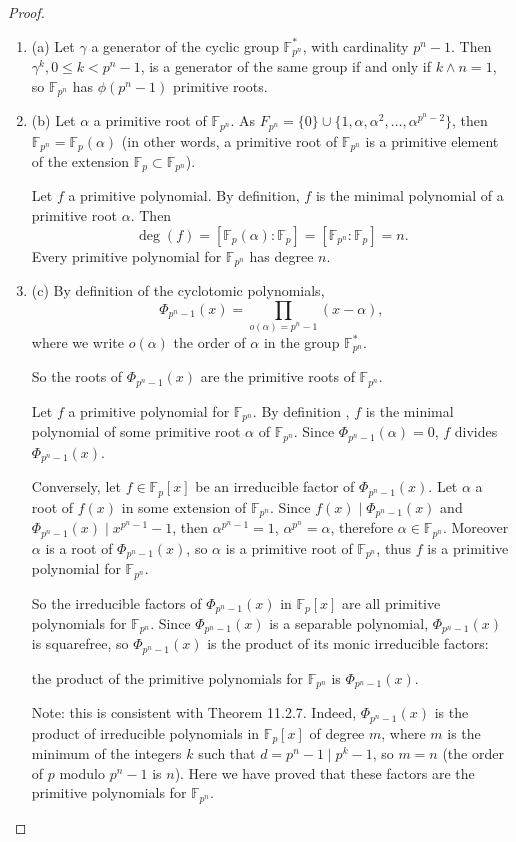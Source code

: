 \documentclass[11pt,a4paper]{article}
\newcommand{\be} {\begin{enumerate}}
\newcommand{\ee} {\end{enumerate}}
\newcommand{\F}{\mathbb{F}}
\begin{document}
\begin{proof}
\be
\item[(a)] Let $\gamma$ a generator of the cyclic group $\F_{p^n}^*$, with cardinality $p^n-1$. Then $\gamma^k, 0 \leq k <p^n-1$, is a generator of the same group if and only if $k \wedge n = 1$, so $\F_{p^n}$ has $\phi(p^n-1)$ primitive roots.

\item[(b)] Let $\alpha$ a primitive root of $\F_{p^n}$. As $F_{p^n} = \{0\} \cup \{1,\alpha,\alpha^2,\ldots,\alpha^{p^n-2}\}$, then $\F_{p^n} = \F_p(\alpha)$ (in other words, a primitive root of $\F_{p^n}$ is a primitive element of the extension $\F_p \subset \F_{p^n}$).

Let $f$ a primitive polynomial. By definition, $f$ is the minimal polynomial of a primitive root $\alpha$. Then
$$\deg(f) = [\F_p(\alpha) : \F_p] = [\F_{p^n}:\F_p] = n.$$
Every primitive polynomial for $\F_{p^n}$ has degree $n$.

\item[(c)] By definition of the cyclotomic polynomials, $$\Phi_{p^n-1}(x) =\prod_{o(\alpha) = p^n-1} (x- \alpha),$$
where we write $o(\alpha )$ the order of $\alpha$ in the group $\F_{p^n}^*$.

So the roots of  $\Phi_{p^n-1}(x) $  are the primitive roots of $\F_{p^n}$.

Let $f$ a primitive polynomial for $\F_{p^n}$. By definition , $f$ is the minimal polynomial of some primitive root $\alpha$ of $\F_{p^n}$. Since $\Phi_{p^n-1}(\alpha) = 0$, $f$ divides $\Phi_{p^n-1}(x)$.

Conversely, let $f \in \F_p[x]$ be an irreducible factor of $\Phi_{p^n-1}(x)$. Let $\alpha$ a root of $f(x)$ in some extension of $\F_{p^n}$. Since $f(x) \mid \Phi_{p^n-1}(x)$ and $\Phi_{p^n-1}(x) \mid x^{p^n-1}-1$, then $\alpha^{p^n-1} = 1$, $\alpha^{p^n} = \alpha$, therefore $\alpha \in \F_{p^n}$. Moreover $\alpha$ is a root of $\Phi_{p^n-1}(x)$, so $\alpha$ is a primitive root of $\F_{p^n}$, thus $f$ is a primitive polynomial for $\F_{p^n}$.

So the irreducible factors of $\Phi_{p^n-1}(x)$ in  $\F_p[x]$ are all primitive polynomials for $\F_{p^n}$. Since $\Phi_{p^n-1}(x)$ is a separable polynomial, $\Phi_{p^n-1}(x)$ is squarefree, so $\Phi_{p^n-1}(x)$ is the product of its monic irreducible factors:
\begin{center}
the product of the primitive polynomials for $\F_{p^n}$ is $\Phi_{p^n-1}(x)$.
\end{center}
Note: this is consistent with Theorem 11.2.7. Indeed, $\Phi_{p^n-1}(x)$ is the product of irreducible polynomials in $\F_p[x]$ of degree $m$, where $m$ is the minimum of the integers $k$ such that $d = p^n - 1 \mid p^k - 1$, so $m=n$ (the order of $p$ modulo $p^n-1$ is $n$). Here we have proved that these factors are the primitive polynomials for $\F_{p^n}$.
\ee
\end{proof}
\end{document}
